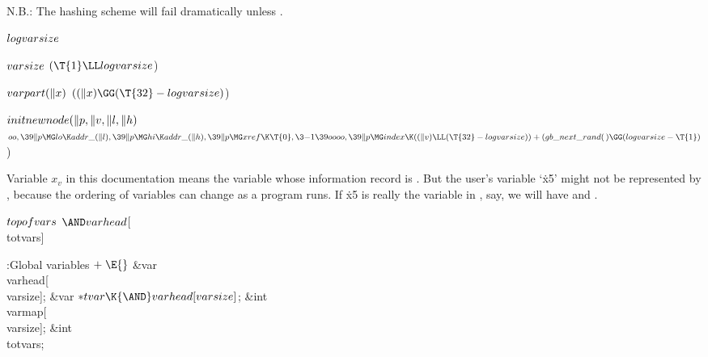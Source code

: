 N.B.: The hashing scheme will fail dramatically unless
.

\Y\B\4\D$\\{logvarsize}$ \5
\par
\B\4\D$\\{varsize}$ \5
$(\T{1}\LL\\{logvarsize}{}$)\par
\B\4\D$\\{varpart}(\|x)$ \5
$((\|x)\GG(\T{32}-\\{logvarsize}){}$)\par
\B\4\D$\\{initnewnode}(\|p,\|v,\|l,\|h)$ \5
$\\{oo},\39\|p\MG\\{lo}\K\\{addr\_}(\|l),\39\|p\MG\\{hi}\K\\{addr\_}(\|h),\39%
\|p\MG\\{xref}\K\T{0},\3{-1}\39\\{oooo},\39\|p\MG\\{index}\K((\|v)\LL(\T{32}-%
\\{logvarsize}))+(\\{gb\_next\_rand}(\,)\GG(\\{logvarsize}-\T{1}){}$)\par
\fi

Variable $x_v$ in this documentation means the variable
whose information
record is . But the user's variable `\.{x5}' might not be
represented by , because the ordering of variables can
change
as a program runs. If \.{x5} is really the variable in , say, we
will have  and .

\Y\B\4\D$\\{topofvars}$ \5
${\AND}\\{varhead}{}$[\\{totvars}]\par
\Y\B\4:Global variables\X${}\mathrel+\E{}$\6
\&{var} \\{varhead}[\\{varsize}];\6
\&{var} ${}{*}\\{tvar}\K{\AND}\\{varhead}[\\{varsize}]{}$;\6
\&{int} \\{varmap}[\\{varsize}];\6
\&{int} \\{totvars};\par
\fi


